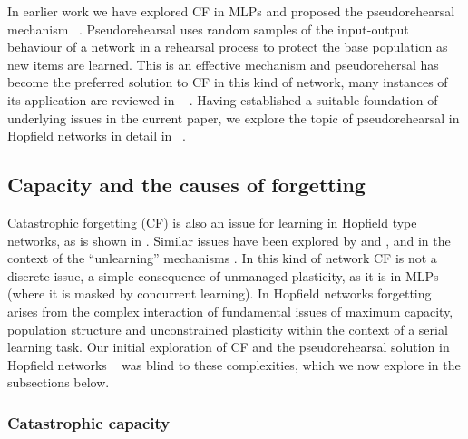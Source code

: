 In earlier work we have explored CF in MLPs and proposed the pseudorehearsal mechanism ~\citep{Robins1995}. Pseudorehearsal uses random samples of the input-output behaviour of a network in a rehearsal process to protect the base population as new items are learned.   This is an effective mechanism and pseudorehersal has become the preferred solution to CF in this kind of network, many instances of its application are reviewed in ~\citet{Robins2004} .  Having established a suitable foundation of underlying issues in the current paper, we explore the topic of pseudorehearsal in Hopfield networks in detail in ~\citet{McCallum2010b}.

\subsection{Capacity and the causes of forgetting}  %
\label{sec:ForgettingCapacity}

Catastrophic forgetting (CF) is also an issue for learning in Hopfield type networks, as is shown in \citet{Robins1998}.  Similar issues have been explored by \citet{Nadal1986} and \citet{Burgess1991}, and in the context of the ``unlearning'' mechanisms .  In this kind of network CF is not a discrete issue, a simple consequence of unmanaged plasticity, as it is in MLPs (where it is masked by concurrent learning).  In Hopfield networks forgetting arises from the complex interaction of fundamental issues of maximum capacity, population structure and unconstrained plasticity within the context of a serial learning task.  Our initial exploration of CF and the pseudorehearsal solution in Hopfield networks ~\citep{Robins1998} was blind to these complexities, which we now explore in the subsections below.  

\subsubsection{Catastrophic capacity}
\label{sec:CatastrophicCapacitySol}


